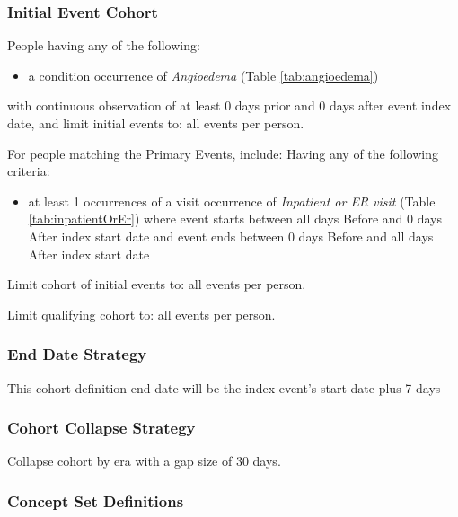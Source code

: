 \documentclass[11pt]{book}
\providecommand{\tightlist}{%
  \setlength{\itemsep}{0pt}\setlength{\parskip}{0pt}}
\theoremstyle{definition}
\theoremstyle{definition}
\theoremstyle{definition}
\theoremstyle{remark}
\begin{document}
\subsubsection*{Initial Event Cohort}\label{initial-event-cohort-3}

People having any of the following:

\begin{itemize}
\tightlist
\item
  a condition occurrence of \emph{Angioedema} (Table
  \ref{tab:angioedema})
\end{itemize}

with continuous observation of at least 0 days prior and 0 days after
event index date, and limit initial events to: all events per person.

For people matching the Primary Events, include: Having any of the
following criteria:

\begin{itemize}
\tightlist
\item
  at least 1 occurrences of a visit occurrence of \emph{Inpatient or ER
  visit} (Table \ref{tab:inpatientOrEr}) where event starts between all
  days Before and 0 days After index start date and event ends between 0
  days Before and all days After index start date
\end{itemize}

Limit cohort of initial events to: all events per person.

Limit qualifying cohort to: all events per person.

\subsubsection*{End Date Strategy}\label{end-date-strategy-3}

This cohort definition end date will be the index event's start date
plus 7 days

\subsubsection*{Cohort Collapse
Strategy}\label{cohort-collapse-strategy-3}

Collapse cohort by era with a gap size of 30 days.

\subsubsection*{Concept Set
Definitions}\label{concept-set-definitions-3}
\end{document}
